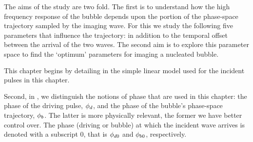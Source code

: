 The aims of the study are two fold.
The first is to understand how the high frequency response of the bubble depends upon the portion of the phase-space trajectory sampled by the imaging wave.
For this we study the following five parameters that influence the trajectory:
in addition to the temporal offset  between the arrival of the two waves. %
The second aim is to explore this  parameter space
to find the `optimum' parameters for imaging a nucleated bubble.



%

 

This chapter begins by  detailing in 
the simple linear model used for the  incident pulses  in this chapter.

Second, in , we distinguish the notions of phase that are used in this chapter:
the phase of the  driving pulse, ${\phi_d}$,
and the phase of the bubble's phase-space trajectory, ${\phi_b}$.
The latter is more physically relevant, 
the former we have better control over. 
The phase (driving or bubble) at which the incident wave arrives is denoted with a subscript 0,
that is ${\phi_{d0}}$ and ${\phi_{b0}}$, respectively.



